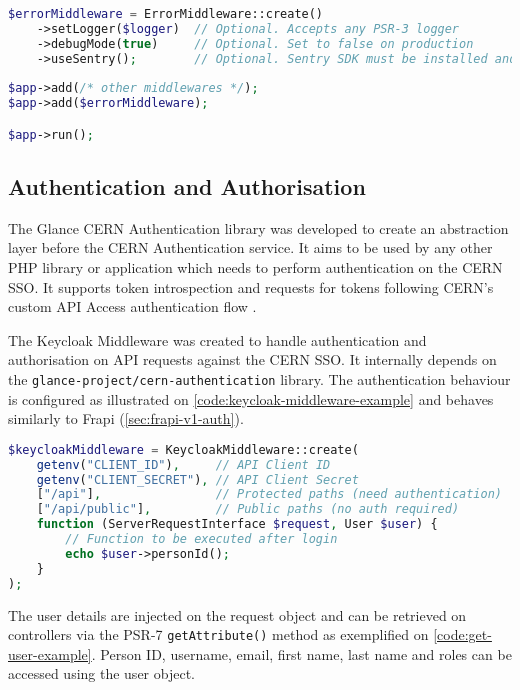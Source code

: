 \begin{lstlisting}[language=PHP,caption={TODO}]
$errorMiddleware = ErrorMiddleware::create()
	->setLogger($logger)  // Optional. Accepts any PSR-3 logger
	->debugMode(true)     // Optional. Set to false on production
	->useSentry();        // Optional. Sentry SDK must be installed and configured
	
$app->add(/* other middlewares */);
$app->add($errorMiddleware);

$app->run();
\end{lstlisting}

\subsection{Authentication and Authorisation}
\label{sec:authentication-and-authorisation}

The Glance CERN Authentication library \cite{cern-authentication-lib} was developed to create an abstraction layer before the CERN Authentication service. It aims to be used by any other PHP library or application which needs to perform authentication on the CERN SSO. It supports token introspection \cite{oauth-token-introspection} \cite{cern-auth-lib-introspec-token} and requests for tokens following CERN's custom API Access authentication flow \cite{cern-auth-service-api-access} \cite{cern-auth-lib-api-access}.

The Keycloak Middleware \cite{keycloak-middleware} was created to handle authentication and authorisation on API requests against the CERN SSO. It internally depends on the \texttt{glance-project/cern-authentication} library. The authentication behaviour is configured as illustrated on \autoref{code:keycloak-middleware-example} and behaves similarly to Frapi (\autoref{sec:frapi-v1-auth}).

\begin{lstlisting}[language=PHP,label={code:keycloak-middleware-example},caption={TODO}]
$keycloakMiddleware = KeycloakMiddleware::create(
    getenv("CLIENT_ID"),     // API Client ID
    getenv("CLIENT_SECRET"), // API Client Secret
    ["/api"],                // Protected paths (need authentication)
    ["/api/public"],         // Public paths (no auth required)
    function (ServerRequestInterface $request, User $user) {
	    // Function to be executed after login
        echo $user->personId();
    }
);
\end{lstlisting}

The user details are injected on the request object and can be retrieved on controllers via the PSR-7 \texttt{getAttribute()} method as exemplified on \autoref{code:get-user-example}. Person ID, username, email, first name, last name and roles can be accessed using the user object.

